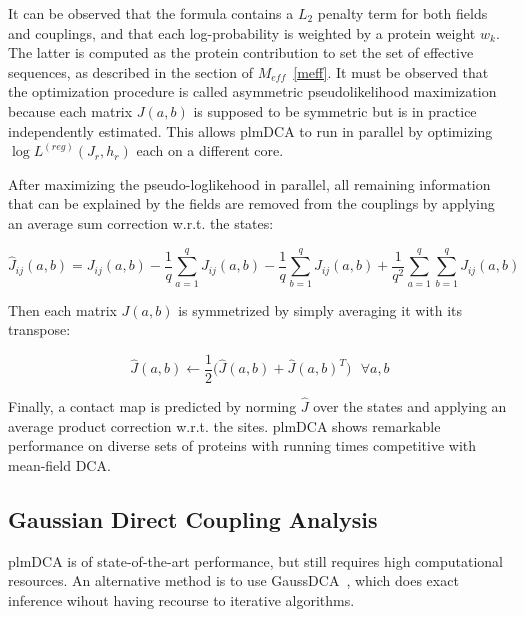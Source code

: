         It can be observed that the formula contains a $L_2$ penalty term for both fields and couplings,  %
        and that each log-probability is weighted by a protein weight $w_k$.
        The latter is computed as the protein contribution to set the set of effective sequences,
        as described in the section of $M_{eff}$~\ref{meff}.  %
        It must be observed that the optimization procedure is called asymmetric pseudolikelihood maximization because
        each matrix $J(a, b)$ is supposed to be symmetric but is in practice  %
        independently estimated. This allows plmDCA to run in parallel by optimizing $\log{L^{(reg)}}(J_r, h_r)$ each on a different core.

        After maximizing the pseudo-loglikehood in parallel, all remaining information
        that can be explained by the fields are removed from the couplings by applying
        an average sum correction w.r.t. the states:

        \begin{equation}  %
            \hat{J}_{ij}(a, b) = J_{ij}(a, b) - \frac{1}{q} \sum\limits_{a=1}^q J_{ij}(a, b) - \frac{1}{q} \sum\limits_{b=1}^q J_{ij}(a, b)
            + \frac{1}{q^2} \sum\limits_{a=1}^q \sum\limits_{b=1}^q J_{ij}(a, b)
        \end{equation}

        Then each matrix $J(a, b)$ is symmetrized by simply averaging it with its transpose:

        \begin{equation}
            \hat{J}(a, b) \leftarrow \frac{1}{2} \big( \hat{J}(a, b) + \hat{J}(a, b)^T \big) \ \ \ \forall a, b
        \end{equation}

        Finally, a contact map is predicted by norming $\hat{J}$ over the states and applying an average product correction w.r.t. the sites.  %
        plmDCA shows remarkable performance on diverse sets of proteins with running times competitive with mean-field DCA.


    \subsection{Gaussian Direct Coupling Analysis}

        plmDCA is of state-of-the-art performance, but still requires high computational resources.
        An alternative method is to use GaussDCA~\cite{10.1371/journal.pone.0092721}, which does
        exact inference wihout having recourse to iterative algorithms.


